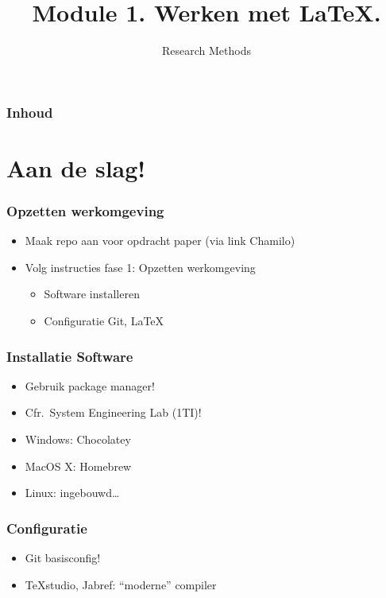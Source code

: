\documentclass[aspectratio=169]{beamer}
\title{Module 1. Werken met \LaTeX.}
\subtitle{Research Methods}
\author{\lecturers}   %
\date{\academicyear}
\begin{document}
\begin{frame}
  \maketitle
\end{frame}

\begin{frame}
  \frametitle{Inhoud}

  \tableofcontents
\end{frame}
\section{Aan de slag!}

\begin{frame}
  \frametitle{Opzetten werkomgeving}

  \begin{itemize}
    \item Maak repo aan voor opdracht paper (via link Chamilo)
    \item Volg instructies fase 1: Opzetten werkomgeving
          \begin{itemize}
            \item Software installeren
            \item Configuratie Git, LaTeX
          \end{itemize}
  \end{itemize}
\end{frame}


\begin{frame}
  \frametitle{Installatie Software}

  \begin{itemize}
    \item Gebruik package manager!
    \item Cfr.\ System Engineering Lab (1TI)!
    \item Windows: Chocolatey
    \item MacOS X: Homebrew
    \item Linux: ingebouwd\ldots
  \end{itemize}
\end{frame}

\begin{frame}
  \frametitle{Configuratie}

  \begin{itemize}
    \item Git basisconfig!
    \item {\TeX}studio, Jabref: ``moderne'' compiler
  \end{itemize}
\end{frame}
\end{document}
